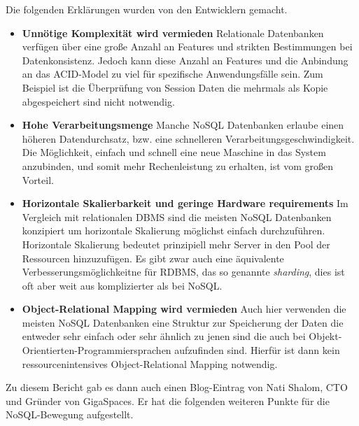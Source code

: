 Die folgenden Erklärungen wurden von den Entwicklern gemacht.
\begin{itemize}
	\item \textbf{Unnötige Komplexität wird vermieden}\newline
	 Relationale Datenbanken verfügen über eine große Anzahl an Features und strikten Bestimmungen bei Datenkonsistenz. Jedoch kann diese Anzahl an Features und die Anbindung an das ACID-Model zu viel für spezifische Anwendungsfälle sein. Zum Beispiel ist die Überprüfung von Session Daten die mehrmals als Kopie abgespeichert sind nicht notwendig.

	\item \textbf{Hohe Verarbeitungsmenge}\newline
	 Manche NoSQL Datenbanken erlaube einen höheren Datendurchsatz, bzw. eine schnelleren Verarbeitungsgeschwindigkeit. Die Möglichkeit, einfach und schnell eine neue Maschine in das System anzubinden, und somit mehr Rechenleistung zu erhalten, ist vom großen Vorteil.

	\item \textbf{Horizontale Skalierbarkeit und geringe Hardware requirements}\newline
	 Im Vergleich mit relationalen DBMS sind die meisten NoSQL Datenbanken konzipiert um horizontale Skalierung möglichst einfach durchzuführen. Horizontale Skalierung bedeutet prinzipiell mehr Server in den Pool der Ressourcen hinzuzufügen. Es gibt zwar auch eine äquivalente Verbesserungsmöglichkeitne für RDBMS, das so genannte \textit{sharding}, dies ist oft aber weit aus komplizierter als bei NoSQL.

	\item \textbf{Object-Relational Mapping wird vermieden}\newline
	 Auch hier verwenden die meisten NoSQL Datenbanken eine Struktur zur Speicherung der Daten die entweder sehr einfach oder sehr ähnlich zu jenen sind die auch bei Objekt-Orientierten-Programmiersprachen aufzufinden sind. Hierfür ist dann kein ressourcenintensives Object-Relational Mapping notwendig.
\end{itemize}

Zu diesem Bericht gab es dann auch einen Blog-Eintrag von Nati Shalom, CTO und Gründer von GigaSpaces. Er hat die folgenden weiteren Punkte für die NoSQL-Bewegung aufgestellt\cite{MELD.CH2-noSQL.natiShalomlol}.

